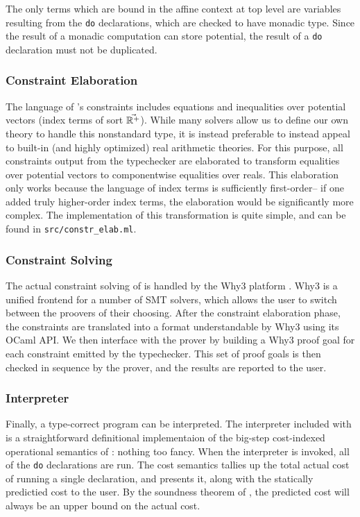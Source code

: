 The only terms which are bound in the affine context at top level are variables resulting from the \texttt{do} declarations, which are checked to have monadic type. Since the result of a monadic computation can store potential, the result of a \texttt{do} declaration must not be duplicated.

\subsubsection{Constraint Elaboration}
The language of \dlambdaamor's constraints includes equations and inequalities over potential vectors (index terms of sort $\vec{\mathbb{R}^+}$). While many solvers allow us to define our own theory to handle this nonstandard type, it is instead  preferable to instead appeal to built-in (and highly optimized) real arithmetic theories. For this purpose, all constraints output from the typechecker are elaborated to transform equalities over potential vectors to componentwise equalities over reals. This elaboration only works because the language of index terms is sufficiently first-order-- if one added truly higher-order index terms, the elaboration would be significantly more complex. The implementation of this transformation is quite simple, and can be found in \texttt{src/constr_elab.ml}.

\subsubsection{Constraint Solving}
The actual constraint solving of \lambdaamorimpl is handled by the Why3 platform \citehere. Why3 is a unified frontend for a number of SMT solvers, which allows the user to switch between the proovers of their choosing. After the constraint elaboration phase, the constraints are translated into a format understandable by Why3 using its OCaml API. We then interface with the prover by building a Why3 proof goal for each constraint emitted by the typechecker. This set of proof goals is then checked in sequence by the prover, and the results are reported to the user.

\subsubsection{Interpreter}
Finally, a type-correct program can be interpreted. The interpreter included with \lambdaamorimpl is a straightforward definitional implementaion of the big-step cost-indexed operational semantics of \dlambdaamor: nothing too fancy. When the interpreter is invoked, all of the \texttt{do} declarations are run. The cost semantics tallies up the total actual cost of running a single declaration, and presents it, along with the statically predictied cost to the user. By the soundness theorem of \dlambdaamor, the predicted cost will always be an upper bound on the actual cost.

